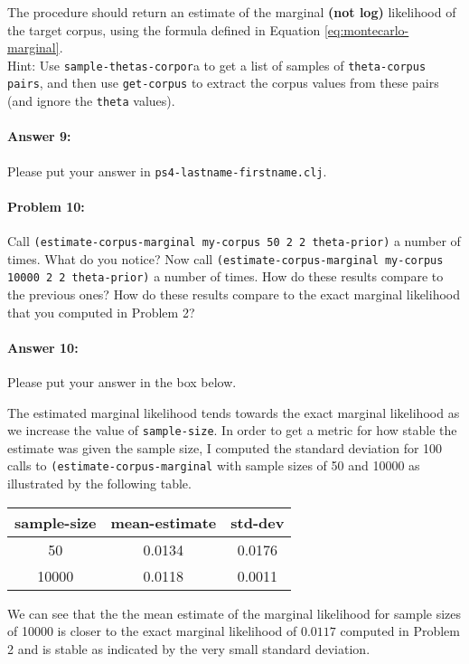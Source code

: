 \documentclass[10pt]{article}
\newcommand{\PSnum}{4}
\begin{document}
The procedure should return an estimate of the marginal
\textbf{(not log)} likelihood of the target corpus, using the formula
defined in Equation \ref{eq:montecarlo-marginal}.  \\

\noindent Hint: Use \texttt{sample-thetas-corpor}a to get a list of
samples of \texttt{theta-corpus pairs}, and then use
\texttt{get-corpus} to extract the corpus values from these pairs (and
ignore the \texttt{theta} values).

\paragraph{Answer 9:} Please put your answer in
\texttt{ps\PSnum-lastname-firstname.clj}.

\noindent\hrulefill %

\paragraph{Problem 10:}

\noindent Call \texttt{(estimate-corpus-marginal my-corpus 50 2 2
  theta-prior)} a number of times. What do you notice? Now call
\texttt{(estimate-corpus-marginal my-corpus 10000 2 2 theta-prior)} a
number of times. How do these results compare to the previous ones?
How do these results compare to the exact marginal
likelihood that you computed in Problem 2?

\paragraph{Answer 10:} Please put your answer in the box below.

\begin{mdframed}
The estimated marginal likelihood tends towards the exact marginal likelihood as we increase the value of \texttt{sample-size}. In order to get a metric for how stable the estimate was given the sample size, I computed the standard deviation for 100 calls to \texttt{(estimate-corpus-marginal} with sample sizes of 50 and 10000 as illustrated by the following table. 

\begin{center}
\begin{tabular}{||c c c||} 
 \hline
 sample-size & mean-estimate & std-dev \\ [0.5ex] 
 \hline\hline
 50 & 0.0134 & 0.0176  \\ 
 \hline
 10000 & 0.0118 & 0.0011 \\ [1ex] 
 \hline
\end{tabular}
\end{center}

We can see that the the mean estimate of the marginal likelihood for sample sizes of 10000 is closer to the exact marginal likelihood of $0.0117$ computed in Problem 2 and is stable as indicated by the very small standard deviation.

\end{mdframed}
 
\end{document}
